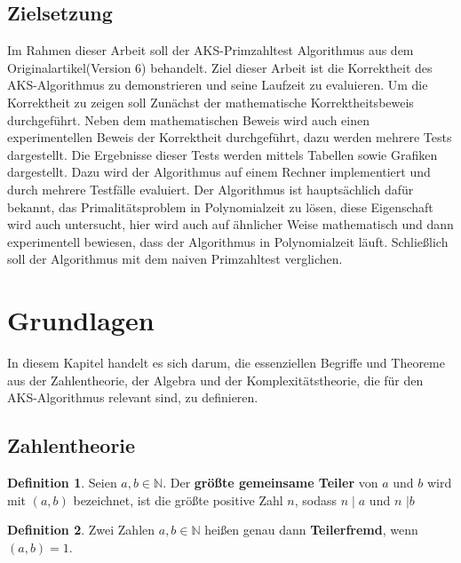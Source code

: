 \documentclass[12pt,oneside]{article}
\theoremstyle{remark}
\theoremstyle{definition}
\newtheorem{definition}{Definition}[section]
\begin{document}
\subsection{Zielsetzung}
Im Rahmen dieser  Arbeit soll der AKS-Primzahltest Algorithmus aus dem Originalartikel(Version 6) behandelt. Ziel dieser Arbeit ist die Korrektheit des AKS-Algorithmus zu demonstrieren und seine Laufzeit zu evaluieren. Um die Korrektheit zu zeigen soll Zunächst der mathematische Korrektheitsbeweis durchgeführt. Neben dem mathematischen Beweis wird auch einen experimentellen Beweis der Korrektheit durchgeführt, dazu werden mehrere Tests dargestellt. Die Ergebnisse dieser Tests werden mittels Tabellen sowie Grafiken dargestellt. Dazu wird der Algorithmus auf einem Rechner implementiert und durch mehrere Testfälle evaluiert. Der Algorithmus ist hauptsächlich dafür bekannt, das Primalitätsproblem in Polynomialzeit zu lösen, diese Eigenschaft wird auch untersucht, hier wird auch auf ähnlicher Weise mathematisch und dann experimentell bewiesen, dass der Algorithmus in Polynomialzeit läuft. Schließlich soll der Algorithmus mit dem naiven Primzahltest verglichen.  


\newpage


\section{Grundlagen}
In diesem Kapitel handelt es sich darum, die essenziellen Begriffe und Theoreme aus der Zahlentheorie, der Algebra und der Komplexitätstheorie, die für den AKS-Algorithmus relevant sind, zu definieren.

\smallskip


\subsection{Zahlentheorie}
\theoremstyle{definition}
\begin{definition}\label{Df_1}
Seien $a,b \in \mathbb{N}$. Der \textbf{größte gemeinsame Teiler} von $a$ und $b$ wird mit $(a,b)$ bezeichnet, ist die größte positive Zahl $n$, sodass $n \mid a$ und $n$ $ \mid b$
\end{definition}

\begin{definition}\label{Df_2}
Zwei Zahlen $a,b \in \mathbb{N}$ heißen genau dann \textbf{Teilerfremd}, wenn $(a,b) = 1$.
\end{definition}
\end{document}
